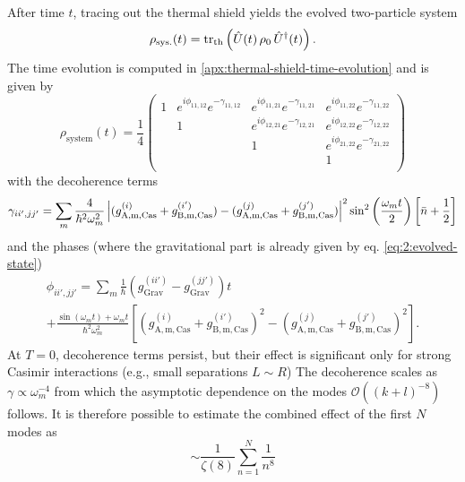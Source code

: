 After time $t$, tracing out the thermal shield yields the evolved two-particle system
\begin{equation}
  \rho_\mathrm{sys.}(t) = \tr_\mathrm{th}\left(\hat{U}(t) \, \rho_0 \, \hat{U}^\dagger(t)\right) .
\end{equation}
The time evolution is computed in \cref{apx:thermal-shield-time-evolution} and is given by
\begin{equation}
  \rho_\mathrm{system}(t) = \frac{1}{4} \begin{pmatrix}
    1 & e^{i\phi_{11,12}} e^{-\gamma_{11,12}} & e^{i\phi_{11,21}} e^{-\gamma_{11,21}} & e^{i\phi_{11,22}} e^{-\gamma_{11,22}} \\
    & 1 & e^{i\phi_{12,21}} e^{-\gamma_{12,21}} & e^{i\phi_{12,22}} e^{-\gamma_{12,22}} \\
    & & 1 & e^{i\phi_{21,22}} e^{-\gamma_{21,22}} \\
    & & & 1 \\
  \end{pmatrix}
\end{equation}
with the decoherence terms
\begin{equation}\label{eq:5:analytical-decoherence}
  \gamma_{ii',jj'} = \sum_m \frac{4}{\hbar^2\omega_m^2} \left\lvert(g^{(i)}_\mathrm{A,m,Cas} + g^{(i')}_\mathrm{B,m,Cas}) - (g^{(j)}_\mathrm{A,m,Cas} + g^{(j')}_\mathrm{B,m,Cas})\right\rvert^2 \sin^2\left(\frac{\omega_m t}{2}\right) \left[\bar{n} + \frac{1}{2}\right]
\end{equation}
and the phases (where the gravitational part is already given by eq. \eqref{eq:2:evolved-state})
\begin{multline}\label{eq:5:analytical-phases}
  \phi_{ii',jj'} = \sum_m \frac{1}{\hbar} \left( g^{(ii')}_\mathrm{Grav} - g^{(jj')}_\mathrm{Grav} \right) t \\
  + \frac{\sin(\omega_m t)+\omega_m t}{\hbar^2\omega_m^2}\left[(g^{(i)}_\mathrm{A,m,Cas} + g^{(i')}_\mathrm{B,m,Cas})^2 - (g^{(j)}_\mathrm{A,m,Cas} + g^{(j')}_\mathrm{B,m,Cas})^2\right] .
\end{multline}
At $T=0$, decoherence terms persist, but their effect is significant only for strong Casimir interactions (e.g., small separations $L\sim R$)
The decoherence scales as $\gamma \propto \omega_m^{-4}$ from which the asymptotic dependence on the modes $\mathcal{O}((k+l)^{-8})$ follows.
It is therefore possible to estimate the combined effect of the first $N$ modes as
\begin{equation}\label{eq:5:effect-of-a-mode}
  \sim \frac{1}{\zeta(8)} \sum_{n=1}^{N} \frac{1}{n^8}
\end{equation}
